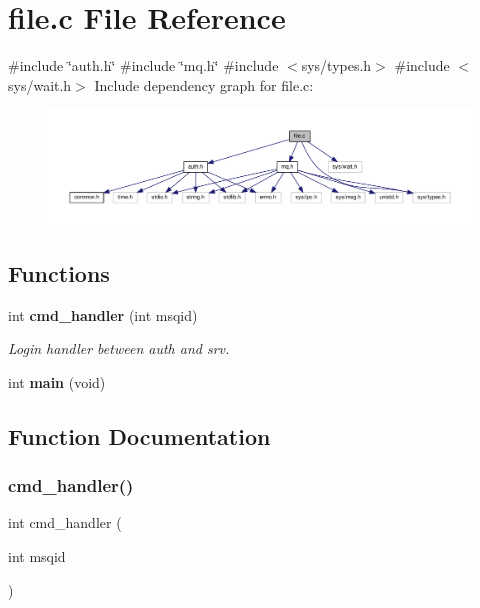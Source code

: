 \section{file.\+c File Reference}
\label{file_8c}
{\ttfamily \#include \char`\"{}auth.\+h\char`\"{}}\newline
{\ttfamily \#include \char`\"{}mq.\+h\char`\"{}}\newline
{\ttfamily \#include $<$sys/types.\+h$>$}\newline
{\ttfamily \#include $<$sys/wait.\+h$>$}\newline
Include dependency graph for file.\+c\+:\nopagebreak
\begin{figure}[H]
\begin{center}
\leavevmode
\includegraphics[width=350pt]{file_8c__incl}
\end{center}
\end{figure}
\subsection*{Functions}
\begin{DoxyCompactItemize}
\item 
int \textbf{ cmd\+\_\+handler} (int msqid)
\begin{DoxyCompactList}\small\item\em Login handler between auth and srv. \end{DoxyCompactList}\item 
int \textbf{ main} (void)
\end{DoxyCompactItemize}


\subsection{Function Documentation}
\mbox{\label{file_8c_a975d9337db509c0204b110f51d723160}} 
\subsubsection{cmd\+\_\+handler()}
{\footnotesize\ttfamily int cmd\+\_\+handler (\begin{DoxyParamCaption}\item[{int}]{msqid }\end{DoxyParamCaption})}



